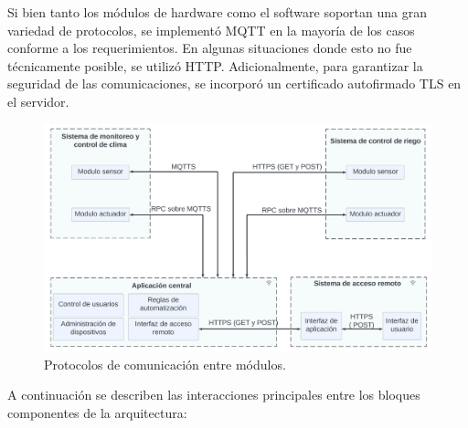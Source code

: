 Si bien tanto los módulos de hardware como el software soportan una gran variedad de protocolos,  se implementó MQTT en la mayoría de los casos conforme a los requerimientos. En algunas situaciones donde esto no fue técnicamente posible, se utilizó HTTP. Adicionalmente, para garantizar la seguridad de las comunicaciones, se incorporó un certificado autofirmado TLS en el servidor.

\begin{figure}[h]
	\centering
	\includegraphics[width=1.0\textwidth]{./Figures/blockproto2.jpg}
	\caption[Protocolos de comunicación entre módulos.]{Protocolos de comunicación entre módulos.}
	\label{fig:blockprotos}
\end{figure}


\pagebreak
 A continuación se describen las interacciones principales entre los bloques componentes de la arquitectura:
 
